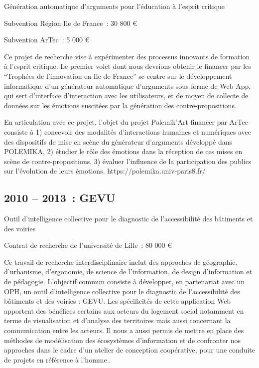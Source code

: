 \documentclass[
  letterpaper,
  DIV=11,
  numbers=noendperiod]{scrreprt}
\begin{document}
Génération automatique d'arguments pour l'éducation à l'esprit critique

Subvention Région Ile de France~: 30 800 €~

Subvention ArTec~: 5 000 €

Ce projet de recherche vise à expérimenter des processus innovants de
formation à l'esprit critique. Le premier volet dont nous devrions
obtenir le financer par les ``Trophées de l'innovation en Ile de
France'' se centre sur le développement informatique d'un générateur
automatique d'arguments sous forme de Web App, qui sert d'interface
d'interaction avec les utilisateurs, et de moyen de collecte de données
sur les émotions suscitées par la génération des contre-propositions.

En articulation avec ce projet, l'objet du projet Polemik'Art financer
par ArTec consiste à 1) concevoir des modalités d'interactions humaines
et numériques avec des dispositifs de mise en scène du générateur
d'arguments développé dans POLEMIKA, 2) étudier le rôle des émotions
dans la réception de ces mises en scène de contre-propositions, 3)
évaluer l'influence de la participation des publics sur l'évolution de
leurs émotions. https://polemika.univ-paris8.fr/

\hypertarget{sec-projetGEVU}{%
\subsection{2010 -- 2013~: GEVU}\label{sec-projetGEVU}}

Outil d'intelligence collective pour le diagnostic de l'accessibilité
des bâtiments et des voiries

Contrat de recherche de l'université de Lille~: 80 000 €~

Ce travail de recherche interdisciplinaire inclut des approches de
géographie, d'urbanisme, d'ergonomie, de science de l'information, de
design d'information et de pédagogie. L'objectif commun consiste à
développer, en partenariat avec un OPH, un outil d'intelligence
collective pour le diagnostic de l'accessibilité des bâtiments et des
voiries : GEVU. Les spécificités de cette application Web apportent des
bénéfices certains aux acteurs du logement social notamment en terme de
visualisation et d'analyse des territoires mais aussi concernant la
communication entre les acteurs. Il nous a aussi permis de mettre en
place des méthodes de modélisation des écosystèmes d'information et de
confronter nos approches dans le cadre d'un atelier de conception
coopérative, pour une conduite de projets en référence à l'homme..
\end{document}
